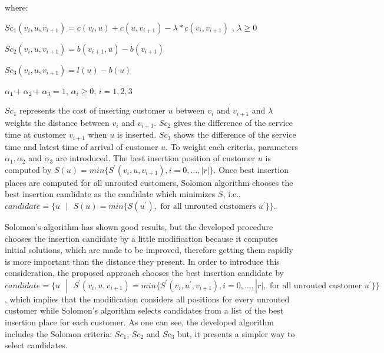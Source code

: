 where:

$Sc_{1}(v_{i},u,v_{i+1})  = c(v_{i},u) +  c(u,v_{i+1})  - \lambda* c(v_{i},v_{i+1})$ , $\lambda \geq 0$

$Sc_{2}(v_{i},u,v_{i+1})  = b(v_{i+1},u) -  b(v_{i+1})  $

$Sc_{3}(v_{i},u,v_{i+1})  = l(u) -  b(u) $

$ \alpha_{1}+\alpha_{2}+ \alpha_{3}=1$,  $\alpha_{i} \geq 0$, $i=1,2,3$

$Sc_{1}$ represents the cost of inserting customer $u$ between $v_{i}$ and $v_{i+1}$ and $\lambda$ weights the distance between $v_{i}$ and $ v_{i+1}$. $Sc_{2}$ gives the difference of the service time at customer $v_{i+1}$ when $u$ is inserted. $Sc_{3}$ shows the difference of the service time and latest time of arrival of customer $u$. To weight each criteria, parameters $ \alpha_{1},\alpha_{2}$ and $\alpha_{3}$ are introduced. The best insertion position of customer $u$ is computed by $S(u)= min \{ S^{'}(v_{i},u,v_{i+1}) , i= 0, \dots, |r| \}$. Once best insertion places are computed for all unrouted customers, Solomon algorithm chooses the best insertion candidate as the candidate which minimizes $S$, i.e., $candidate = \{u \text{ }| \text{ }S(u) = min\{S(u^{'} ), \text{ for all unrouted customers } u^{'} \} \}$. 

Solomon's algorithm has shown good results, but the developed procedure chooses the insertion candidate by a little modification because it computes initial solutions, which are made to be improved, therefore getting them rapidly is more important than the distance they present. In order to introduce this consideration, the proposed approach chooses the best insertion candidate by $candidate =\{u \text{ } | \text{ } S^{'}(v_{i},u,v_{i+1}) =  min \{ S^{'}(v_{i},u^{'},v_{i+1}) , i= 0, \dots, |r|, \text{ for all unrouted customer } u^{'} \}\}$, which implies that the modification considers all positions for every unrouted customer while Solomon's algorithm selects candidates from a list of the best insertion place for each customer. As one can see, the developed algorithm includes the Solomon criteria: $Sc_{1}$, $Sc_{2}$ and $Sc_{3}$ but, it presents a simpler way to select candidates. 

